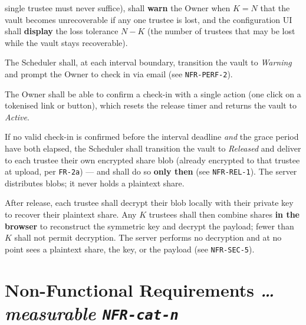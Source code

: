 \documentclass[11pt,a4paper]{article}
\newcommand{\BvrHint}[1]{%
  {\normalfont\normalsize\itshape\hfill #1}}
\newcommand{\ReqID}[1]{\texttt{#1}}
\begin{document}
\begin{description}[leftmargin=0cm,style=nextline]
    single trustee must never suffice), shall \textbf{warn} the Owner when
    $K = N$ that the vault becomes unrecoverable if any one trustee is lost, and
    the configuration UI shall \textbf{display} the loss tolerance $N - K$ (the
    number of trustees that may be lost while the vault stays recoverable).
  \item[\ReqID{FR-5} Scheduled check-in prompts.] The Scheduler shall, at each
    interval boundary, transition the vault to \emph{Warning} and prompt the
    Owner to check in via email (see \ReqID{NFR-PERF-2}).
  \item[\ReqID{FR-6} One-action check-in confirmation.] The Owner shall be able
    to confirm a check-in with a single action (one click on a tokenised link
    or button), which resets the release timer and returns the vault to
    \emph{Active}.
  \item[\ReqID{FR-7} Blob distribution on expiry.] If no valid check-in is
    confirmed before the interval deadline \emph{and} the grace period have
    both elapsed, the Scheduler shall transition the vault to \emph{Released}
    and deliver to each trustee their own encrypted share blob (already
    encrypted to that trustee at upload, per \ReqID{FR-2a}) --- and shall do so
    \textbf{only then} (see \ReqID{NFR-REL-1}). The server distributes blobs; it
    never holds a plaintext share.
  \item[\ReqID{FR-8} Client-side $K$-of-$N$ reconstruction \& decryption.] After
    release, each trustee shall decrypt their blob locally with their private key
    to recover their plaintext share. Any $K$ trustees shall then combine shares
    \textbf{in the browser} to reconstruct the symmetric key and decrypt the
    payload; fewer than $K$ shall not permit decryption. The server performs no
    decryption and at no point sees a plaintext share, the key, or the payload
    (see \ReqID{NFR-SEC-5}).
\end{description}

\section{Non-Functional Requirements
  \BvrHint{\ldots measurable \ReqID{NFR-\textit{cat}-\textit{n}}}}
\end{document}
